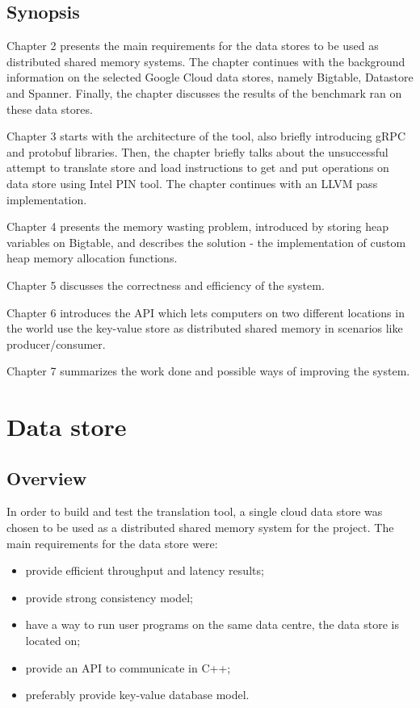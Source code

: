\documentclass[bsc,frontabs,twoside,singlespacing,parskip,deptreport]{infthesis}     %
\begin{document}

\section{Synopsis}

Chapter 2 presents the main requirements for the data stores to be used as distributed shared memory systems. The chapter continues with the background information on the selected Google Cloud data stores, namely Bigtable, Datastore and Spanner. Finally, the chapter discusses the results of the benchmark ran on these data stores.

Chapter 3 starts with the architecture of the tool, also briefly introducing gRPC and protobuf libraries. Then, the chapter briefly talks about the unsuccessful attempt to translate store and load instructions to get and put operations on data store using Intel PIN tool. The chapter continues with an LLVM pass implementation.

Chapter 4 presents the memory wasting problem, introduced by storing heap variables on Bigtable, and describes the solution - the implementation of custom heap memory allocation functions. 

Chapter 5 discusses the correctness and efficiency of the system. 

Chapter 6 introduces the API which lets computers on two different locations in the world use the key-value store as distributed shared memory in scenarios like producer/consumer.

Chapter 7 summarizes the work done and possible ways of improving the system.

\chapter{Data store}

\section{Overview}

In order to build and test the translation tool, a single cloud data store was chosen to be used as a distributed shared memory system for the project. The main requirements for the data store were:

\begin{itemize}
\item
provide efficient throughput and latency results;
\item
provide strong consistency model;
\item
have a way to run user programs on the same data centre, the data store is located on;
\item
provide an API to communicate in C++;
\item
preferably provide key-value database model.
\end{itemize}
\end{document}
